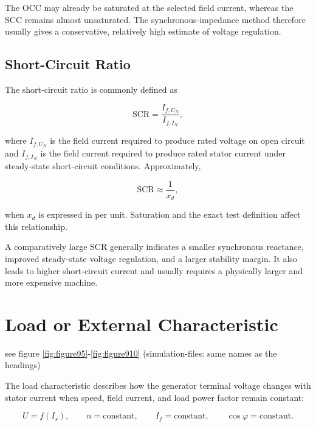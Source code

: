 The OCC may already be saturated at the selected field current, whereas the
SCC remains almost unsaturated. The synchronous-impedance method therefore
usually gives a conservative, relatively high estimate of voltage regulation.

\subsection{Short-Circuit Ratio}

The short-circuit ratio is commonly defined as

\begin{equation}
  \mathrm{SCR}
  =\frac{I_{f,U_N}}{I_{f,I_N}},
  \label{eq:sg-scr}
\end{equation}

where $I_{f,U_N}$ is the field current required to produce rated voltage on
open circuit and $I_{f,I_N}$ is the field current required to produce rated
stator current under steady-state short-circuit conditions. Approximately,

\begin{equation}
  \mathrm{SCR}\approx\frac{1}{x_d},
\end{equation}

when $x_d$ is expressed in per unit. Saturation and the exact test definition
affect this relationship.

A comparatively large SCR generally indicates a smaller synchronous
reactance, improved steady-state voltage regulation, and a larger stability
margin. It also leads to higher short-circuit current and usually requires a
physically larger and more expensive machine.

\newpage

\section{Load or External Characteristic} see figure \ref{fig:figure95}-\ref{fig:figure910}  (simulation-files: same names as the headings) 
\label{sec:sg-load-characteristic}

The load characteristic describes how the generator terminal voltage changes
with stator current when speed, field current, and load power factor remain
constant:

\begin{equation}
  U=f(I_s),
  \qquad
  n=\text{constant},
  \qquad
  I_f=\text{constant},
  \qquad
  \cos\varphi=\text{constant}.
  \label{eq:sg-load-characteristic}
\end{equation}

